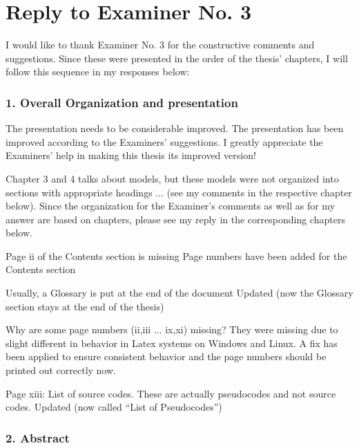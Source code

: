 \section*{Reply to Examiner No. 3}

\begin{replyheader}
\end{replyheader}  

I would like to thank Examiner No. 3 for the constructive comments and suggestions. Since these were presented in the order of the thesis' chapters, I will follow this sequence in my responses below:

\subsubsection*{1. Overall Organization and presentation}

\replyToComment
    {The presentation needs to be considerable improved.}
    {The presentation has been improved according to the Examiners' suggestions. I greatly appreciate the Examiners' help in making this thesis its improved version!}

\replyToComment
    {Chapter 3 and 4 talks about models, but these models were not organized into sections with appropriate headings ... (see my comments in the respective chapter below).}
    {Since the organization for the Examiner's comments as well as for my answer are based on chapters, please see my reply in the corresponding chapters below.}

\replyToComment
    {Page ii of the Contents section is missing}
    {Page numbers have been added for the Contents section}

\replyToComment
    {Usually, a Glossary is put at the end of the document}
    {Updated (now the Glossary section stays at the end of the thesis)}

\replyToComment
    {Why are some page numbers (ii,iii ... ix,xi) missing?}
    {They were missing due to slight different in behavior in Latex systems on Windows and Linux. A fix has been applied to ensure consistent behavior and the page numbers should be printed out correctly now.}

\replyToComment
    {Page xiii: List of source codes. These are actually pseudocodes and not source codes.}
    {Updated (now called ``List of Pseudocodes'')}

\subsubsection*{2. Abstract}


